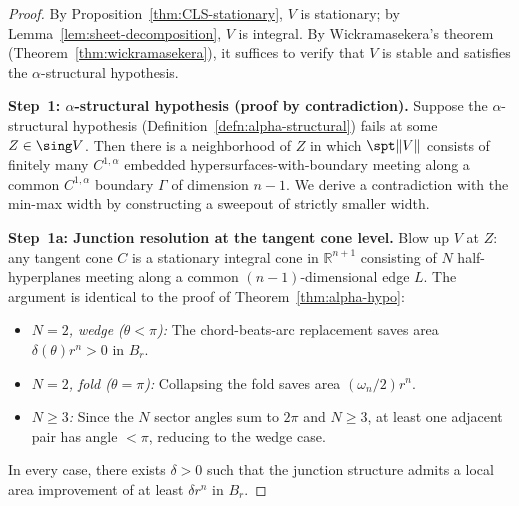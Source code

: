 \begin{proof}
By Proposition~\ref{thm:CLS-stationary}, $V$ is stationary; by Lemma~\ref{lem:sheet-decomposition}, $V$ is integral. By Wickramasekera's theorem (Theorem~\ref{thm:wickramasekera}), it suffices to verify that $V$ is stable and satisfies the $\alpha$-structural hypothesis.

\medskip\noindent\textbf{Step~1: $\alpha$-structural hypothesis (proof by contradiction).}
Suppose the $\alpha$-structural hypothesis (Definition~\ref{defn:alpha-structural}) fails at some $Z \in \sing V$. Then there is a neighborhood of $Z$ in which $\spt\|V\|$ consists of finitely many $C^{1,\alpha}$ embedded hypersurfaces-with-boundary meeting along a common $C^{1,\alpha}$ boundary $\Gamma$ of dimension $n - 1$. We derive a contradiction with the min-max width by constructing a sweepout of strictly smaller width.

\medskip\noindent\textbf{Step~1a: Junction resolution at the tangent cone level.}
Blow up $V$ at $Z$: any tangent cone $C$ is a stationary integral cone in $\mathbb{R}^{n+1}$ consisting of $N$ half-hyperplanes meeting along a common $(n-1)$-dimensional edge $L$. The argument is identical to the proof of Theorem~\ref{thm:alpha-hypo}:
\begin{itemize}
    \item \emph{$N = 2$, wedge ($\theta < \pi$):} The chord-beats-arc replacement saves area $\delta(\theta) r^n > 0$ in $B_r$.

    \item \emph{$N = 2$, fold ($\theta = \pi$):} Collapsing the fold saves area $(\omega_n/2) r^n$.

    \item \emph{$N \geq 3$:} Since the $N$ sector angles sum to $2\pi$ and $N \geq 3$, at least one adjacent pair has angle $< \pi$, reducing to the wedge case.
\end{itemize}
In every case, there exists $\delta > 0$ such that the junction structure admits a local area improvement of at least $\delta r^n$ in $B_r$.


\end{proof}
